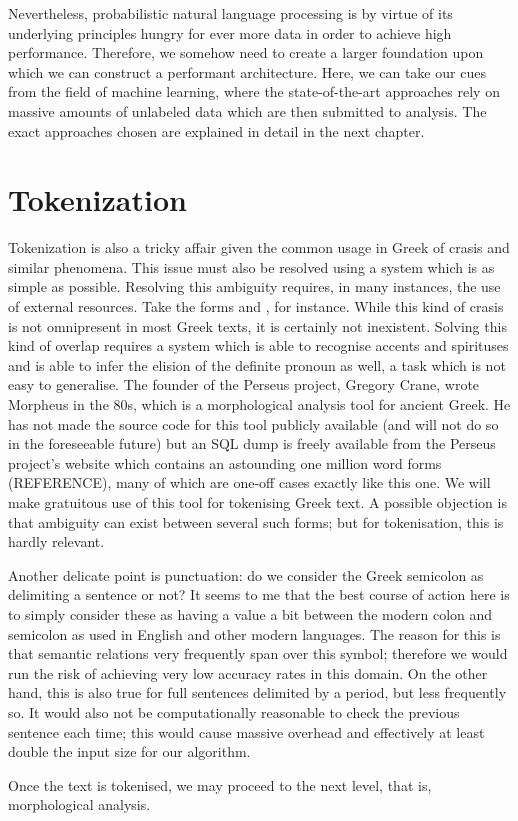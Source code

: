 Nevertheless, probabilistic natural language processing is by virtue
of its underlying principles hungry for ever more data in order to
achieve high performance. Therefore, we somehow need to create a
larger foundation upon which we can construct a performant
architecture. Here, we can take our cues from the field of machine
learning, where the state-of-the-art approaches rely on massive
amounts of unlabeled data which are then submitted to analysis. The
exact approaches chosen are explained in detail in the next chapter.

\section{Tokenization}

Tokenization is also a tricky affair given the common usage in Greek
of crasis and similar phenomena. This issue must also be resolved using a
system which is as simple as possible. Resolving this ambiguity
requires, in many instances, the use of external resources. Take the
forms  \Latin and  \Latin, for instance. While this kind of crasis
is not omnipresent in most Greek texts, it is certainly not
inexistent. Solving this kind of overlap requires a system which is
able to recognise accents and spirituses and is able to infer the
elision of the definite pronoun  \Latin as well, a task which is not easy to
generalise. The founder of the Perseus project, Gregory Crane, wrote
Morpheus in the 80s, which is a morphological analysis tool for
ancient Greek. He has not made the source code for this tool publicly
available (and will not do so in the foreseeable future) but an SQL
dump is freely available from the Perseus project's website which
contains an astounding one million word forms (REFERENCE), many of which are
one-off cases exactly like this one. We will make gratuitous use of
this tool for tokenising Greek text. A possible objection is that
ambiguity can exist between several such forms; but for tokenisation,
this is hardly relevant.

Another delicate point is punctuation: do we consider the Greek
semicolon as delimiting a sentence or not? It seems to me that the
best course of action here is to simply consider these as having a
value a bit between the modern colon and semicolon as used in English
and other modern languages. The reason for this is that semantic
relations very frequently span over this symbol; therefore we would
run the risk of achieving very low accuracy rates in this domain. On
the other hand, this is also true for full sentences delimited by a
period, but less frequently so. It would also not be computationally
reasonable to check the previous sentence each time; this would cause
massive overhead and effectively at least double the input size for
our algorithm.

Once the text is tokenised, we may proceed to the next level, that is, morphological analysis. 